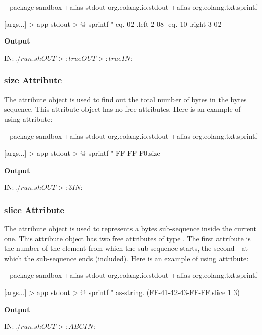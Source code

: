 \documentclass[12pt]{book}
\begin{document}
{\begin{ffcode}
+package sandbox
+alias stdout org.eolang.io.stdout
+alias org.eolang.txt.sprintf

[args...] > app
  stdout > @
    sprintf
      "%
      eq.
        02-.left 2
        08-
      eq.
        10-.right 3
        02-
\end{ffcode}
\textbf{Output}
\begin{ffcode}
IN$: ./run.sh
OUT>: true
OUT>: true
IN$: 
\end{ffcode}

\subsubsection{size Attribute}
The  attribute object is used to find out the total number of bytes in the bytes sequence. This attribute object has no free attributes. Here is an example of using  attribute:

\begin{ffcode}
+package sandbox
+alias stdout org.eolang.io.stdout
+alias org.eolang.txt.sprintf

[args...] > app
  stdout > @
    sprintf
      "%
      FF-FF-F0.size
\end{ffcode}
\textbf{Output}
\begin{ffcode}
IN$: ./run.sh
OUT>: 3
IN$: 
\end{ffcode}

\subsubsection{slice Attribute}
The  attribute object is used to represents a bytes sub-sequence inside the current one. This attribute object has two free attributes of type . The first attribute is the number of the element from which the sub-sequence starts, the second - at which the sub-sequence ends (included). Here is an example of using  attribute:

\begin{ffcode}
+package sandbox
+alias stdout org.eolang.io.stdout
+alias org.eolang.txt.sprintf

[args...] > app
  stdout > @
    sprintf
      "%
      as-string.
        (FF-41-42-43-FF-FF.slice 1 3)
\end{ffcode}
\textbf{Output}
\begin{ffcode}
IN$: ./run.sh
OUT>: ABC
IN$: 
\end{ffcode}

}
\end{document}
